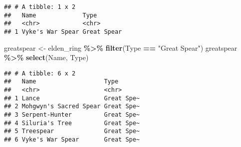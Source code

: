 \documentclass[
]{article}
\newenvironment{Shaded}{\begin{snugshade}}{\end{snugshade}}
\newcommand{\FunctionTok}[1]{\textcolor[rgb]{0.13,0.29,0.53}{\textbf{#1}}}
\newcommand{\NormalTok}[1]{#1}
\newcommand{\OtherTok}[1]{\textcolor[rgb]{0.56,0.35,0.01}{#1}}
\newcommand{\SpecialCharTok}[1]{\textcolor[rgb]{0.81,0.36,0.00}{\textbf{#1}}}
\newcommand{\StringTok}[1]{\textcolor[rgb]{0.31,0.60,0.02}{#1}}
\begin{document}
\begin{verbatim}
## # A tibble: 1 x 2
##   Name             Type       
##   <chr>            <chr>      
## 1 Vyke's War Spear Great Spear
\end{verbatim}

\begin{Shaded}
\begin{Highlighting}[]
\NormalTok{greatspear }\OtherTok{\textless{}{-}}\NormalTok{ elden\_ring }\SpecialCharTok{\%\textgreater{}\%}
  \FunctionTok{filter}\NormalTok{(Type }\SpecialCharTok{==} \StringTok{"Great Spear"}\NormalTok{)}
\NormalTok{greatspear }\SpecialCharTok{\%\textgreater{}\%}
  \FunctionTok{select}\NormalTok{(Name, Type)}
\end{Highlighting}
\end{Shaded}

\begin{verbatim}
## # A tibble: 6 x 2
##   Name                   Type      
##   <chr>                  <chr>     
## 1 Lance                  Great Spe~
## 2 Mohgwyn's Sacred Spear Great Spe~
## 3 Serpent-Hunter         Great Spe~
## 4 Siluria's Tree         Great Spe~
## 5 Treespear              Great Spe~
## 6 Vyke's War Spear       Great Spe~
\end{verbatim}
\end{document}
